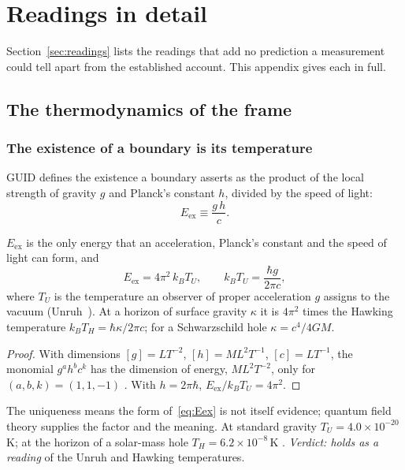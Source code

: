 \section{Readings in detail}\label{app:readings}

Section~\ref{sec:readings} lists the readings that add no prediction a measurement could tell apart from the established account. This appendix gives each in full.
\subsection{The thermodynamics of the frame}\label{sec:thermo}

\subsubsection{The existence of a boundary is its temperature}

GUID defines the existence a boundary asserts as the product of the local strength of gravity $g$ and Planck's constant $h$, divided by
the speed of light:
\begin{equation}\label{eq:Eex}
E_{\text{ex}}\equiv\frac{g\,h}{c}.
\end{equation}

\begin{proposition}\label{pr:unruh}
$E_{\text{ex}}$ is the only energy that an acceleration, Planck's constant and the speed of light can form, and
\begin{equation}\label{eq:unruh}
E_{\text{ex}}=4\pi^2\,k_BT_U,\qquad k_BT_U=\frac{\hbar g}{2\pi c},
\end{equation}
where $T_U$ is the temperature an observer of proper acceleration $g$ assigns to the vacuum (Unruh~\cite{unruh}). At a horizon of surface
gravity $\kappa$ it is $4\pi^2$ times the Hawking temperature $k_BT_H=\hbar\kappa/2\pi c$; for a Schwarzschild hole $\kappa=c^4/4GM$.
\end{proposition}

\begin{proof}
With dimensions $[g]=LT^{-2}$, $[h]=ML^2T^{-1}$, $[c]=LT^{-1}$, the monomial $g^ah^bc^k$ has the dimension of energy, $ML^2T^{-2}$, only
for $(a,b,k)=(1,1,-1)$ . With $h=2\pi\hbar$, $E_{\text{ex}}/k_BT_U=4\pi^2$.
\end{proof}

The uniqueness means the form of~\eqref{eq:Eex} is not itself evidence; quantum field theory supplies the factor and the meaning. At standard
gravity $T_U=4.0\times10^{-20}$\,K; at the horizon of a solar-mass hole $T_H=6.2\times10^{-8}$\,K . \emph{Verdict: holds as a
reading} of the Unruh and Hawking temperatures.


